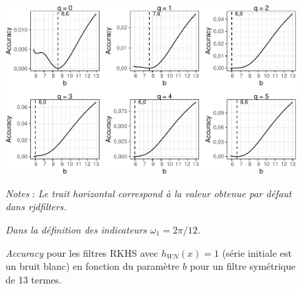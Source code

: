 \documentclass[
  11pt,
  french,
  a4paper]{article}
\newcommand\1{\mathds{1}}
\begin{document}
\begin{figure}[H]

{\centering \includegraphics{img/bookdown/pdf/rkhsoptiaccuracy6wn-1} 

}

\caption[\emph{Accuracy} pour les filtres RKHS avec \(h_{WN}(x)=1\) (série initiale est un bruit blanc) en fonction du paramètre \(b\) pour un filtre symétrique de 13 termes]{\emph{Accuracy} pour les filtres RKHS avec \(h_{WN}(x)=1\) (série initiale est un bruit blanc) en fonction du paramètre \(b\) pour un filtre symétrique de 13 termes.}\label{fig:rkhsoptiaccuracy6wn}

\footnotesize


\emph{Notes} : \emph{Le trait horizontal correspond à la valeur obtenue par défaut dans rjdfilters.}

\emph{Dans la définition des indicateurs \(\omega_1=2\pi/12\).}
\normalsize\end{figure}
\end{document}
